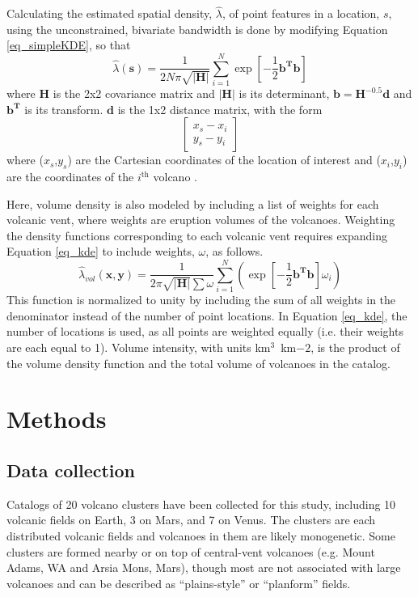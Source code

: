 Calculating the estimated spatial density, $\hat{\lambda}$, of point features in a location, $s$, using the unconstrained, bivariate bandwidth is done by modifying Equation \ref{eq_simpleKDE}, so that
\begin{equation}
\hat{\lambda}(\mathbf{s})=\frac{1}{2N\pi\sqrt{|\mathbf{H}|}}\sum\limits_{i=1}^{N}\exp\left[-\frac{1}{2}\mathbf{b^Tb}\right]
\label{eq_kde}
\end{equation}
where $\mathbf{H}$ is the 2x2 covariance matrix and $|\mathbf{H}|$ is its determinant, $\mathbf{b}=\mathbf{H}^{-0.5}\mathbf{d}$ and $\mathbf{b^T}$ is its transform. $\mathbf{d}$ is the 1x2 distance matrix, with the form
\begin{equation}\begin{bmatrix}
x_s-x_i\\
y_s-y_i
\label{eq_distancematrix}
\end{bmatrix}\end{equation}
where ($x_s$,$y_s$) are the Cartesian coordinates of the location of interest and ($x_i$,$y_i$) are the coordinates of the $i^{\text{th}}$ volcano \citep{connor2015probabilistic}.

Here, volume density is also modeled by including a list of weights for each volcanic vent, where weights are eruption volumes of the volcanoes. Weighting the density functions corresponding to each volcanic vent requires expanding Equation \ref{eq_kde} to include weights, $\omega$, as follows.
\begin{equation}
\hat{\lambda}_{vol}(\mathbf{x,y})=\frac{1}{2\pi\sqrt{|\mathbf{H}|}\sum{\omega}}\sum\limits_{i=1}^{N}\left(\exp\left[-\frac{1}{2}\mathbf{b^Tb}\right]\omega_i\right)
\label{eq_weigthedkde}
\end{equation}
This function is normalized to unity by including the sum of all weights in the denominator instead of the number of point locations. In Equation \ref{eq_kde}, the number of locations is used, as all points are weighted equally (i.e. their weights are each equal to 1). Volume intensity, with units km$^3$~km${-2}$, is the product of the volume density function and the total volume of volcanoes in the catalog.

\section{Methods}

\subsection{Data collection}
Catalogs of 20 volcano clusters have been collected for this study, including 10 volcanic fields on Earth, 3 on Mars, and 7 on Venus. The clusters are each distributed volcanic fields and volcanoes in them are likely monogenetic. Some clusters are formed nearby or on top of central-vent volcanoes (e.g. Mount Adams, WA and Arsia Mons, Mars), though most are not associated with large volcanoes and can be described as ``plains-style'' \citep{greeley1977basaltic} or ``planform'' \citep{settle1979structure} fields. 

